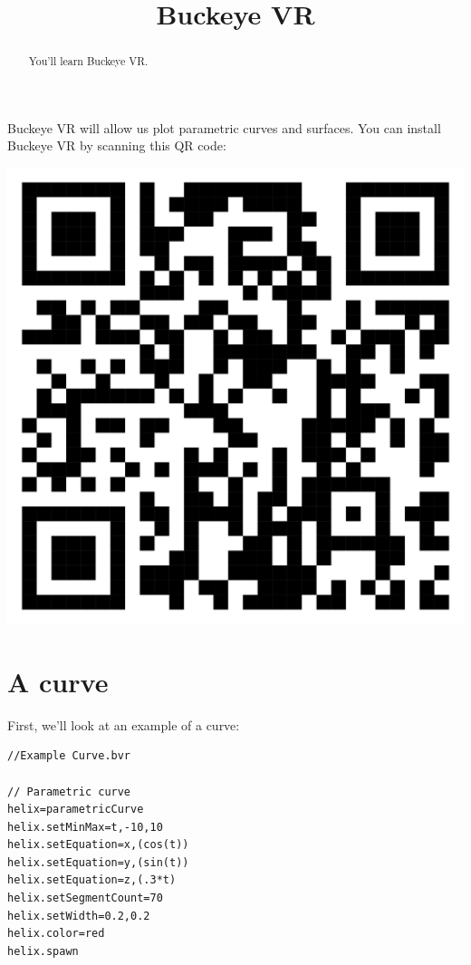 \documentclass{ximera}
\title{Buckeye VR}
\begin{document}
\begin{abstract}
  You'll learn Buckeye VR.
\end{abstract}
\maketitle

Buckeye VR will allow us plot parametric curves and surfaces.
You can install Buckeye VR by scanning this QR code:
\begin{image}
  \includegraphics{QRBVRPlot.png}
\end{image}



\section{A curve}

First, we'll look at an example of a curve:

\begin{verbatim}
//Example Curve.bvr

// Parametric curve
helix=parametricCurve
helix.setMinMax=t,-10,10
helix.setEquation=x,(cos(t))
helix.setEquation=y,(sin(t))
helix.setEquation=z,(.3*t)
helix.setSegmentCount=70
helix.setWidth=0.2,0.2
helix.color=red
helix.spawn
\end{verbatim}
\end{document}
